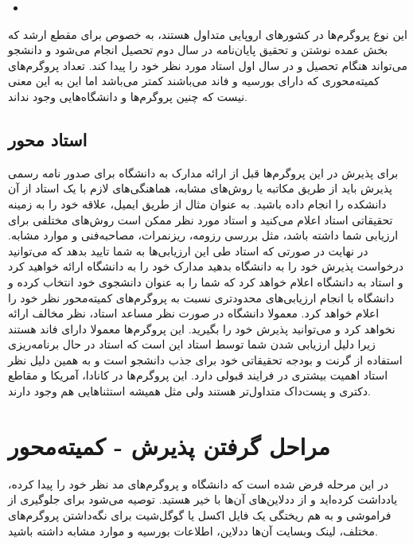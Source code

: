 \begin{itemize}[leftmargin=1.5cm]
\item \href{https://www.aalto.fi/en/study-options/machine-learning-data-science-and-artificial-intelligence-master-of-science-technology}{}
\end{itemize}

این نوع پروگرم‌ها در کشور‌های اروپایی متداول هستند، به خصوص برای مقطع ارشد که بخش عمده نوشتن و تحقیق پایان‌نامه در سال دوم 
تحصیل انجام می‌شود و دانشجو می‌تواند هنگام تحصیل و در سال اول استاد مورد نظر خود را پیدا کند. تعداد پروگرم‌های کمیته‌محوری که دارای 
بورسیه و فاند می‌باشند کمتر می‌باشد اما این به این معنی نیست که چنین پروگرم‌ها و دانشگاه‌هایی وجود نداند. 

\subsection{استاد محور}
برای پذیرش در این پروگرم‌ها قبل از ارائه مدارک به دانشگاه برای صدور نامه رسمی پذیرش باید از طریق مکاتبه یا روش‌های مشابه، هماهنگی‌های لازم
با یک استاد از آن دانشکده را انجام داده باشید. به عنوان مثال از طریق ایمیل، علاقه خود را به زمینه تحقیقاتی استاد اعلام می‌کنید و استاد 
مورد نظر ممکن است روش‌های مختلفی برای ارزیابی شما داشته باشد، مثل بررسی رزومه، ریزنمرات، مصاحبه‌فنی و موارد مشابه. در نهایت در صورتی که 
استاد طی این ارزیابی‌ها به شما تایید بدهد که می‌توانید درخواست پذیرش خود را به دانشگاه بدهید  مدارک خود را به دانشگاه ارائه خواهید کرد و 
استاد به دانشگاه اعلام خواهد کرد که شما را به عنوان دانشجوی خود انتخاب کرده و دانشگاه با انجام ارزیابی‌های محدود‌تری نسبت به پروگرم‌های کمیته‌محور
نظر خود را اعلام خواهد کرد. معمولا دانشگاه در صورت نظر مساعد استاد، نظر مخالف ارائه نخواهد کرد و می‌توانید پذیرش خود را بگیرید. 
این پروگرم‌ها معمولا دارای فاند هستند زیرا دلیل ارزیابی شدن شما توسط استاد این است که استاد در حال برنامه‌ریزی استفاده از گرنت و بودجه تحقیقاتی
خود برای جذب دانشجو است و به همین دلیل نظر استاد اهمیت بیشتری در فرایند قبولی دارد. این پروگرم‌ها در کانادا، آمریکا و مقاطع دکتری و پست‌داک 
متداول‌تر هستند ولی مثل همیشه استثنا‌هایی هم وجود دارند. 


\section{مراحل گرفتن پذیرش - کمیته‌محور}
در این مرحله فرض شده است که دانشگاه‌ و پروگرم‌های مد نظر خود را پیدا کرده، یادداشت کرده‌اید و از ددلاین‌های آن‌ها با خیر هستید. 
توصیه می‌شود برای جلوگیری از فراموشی و به هم ریختگی یک فایل اکسل یا گوگل‌شیت برای نگه‌داشتن پروگرم‌های مختلف، لینک وبسایت آن‌ها 
ددلاین، اطلاعات بورسیه و موارد مشابه داشته باشید. 

